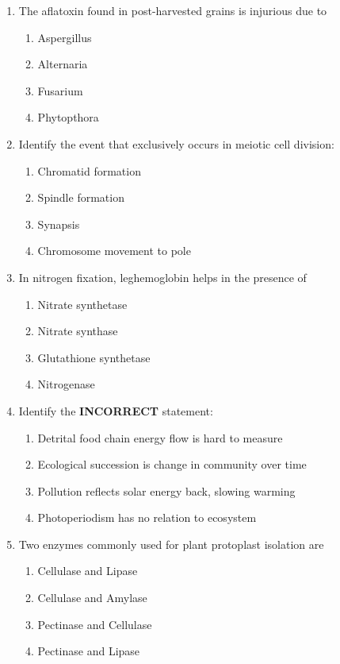 \documentclass[journal]{IEEEtran}
\begin{document}
\begin{enumerate}
\item The aflatoxin found in post-harvested grains is injurious due to\hfill  \textit{}
\begin{enumerate}
    \item Aspergillus
    \item Alternaria
    \item Fusarium
    \item Phytopthora
\end{enumerate}

\item Identify the event that exclusively occurs in meiotic cell division:\hfill  \textit{}
\begin{enumerate}
    \item Chromatid formation
    \item Spindle formation
    \item Synapsis
    \item Chromosome movement to pole
\end{enumerate}

\item In nitrogen fixation, leghemoglobin helps in the presence of\hfill  \textit{}
\begin{enumerate}
    \item Nitrate synthetase
    \item Nitrate synthase
    \item Glutathione synthetase
    \item Nitrogenase
\end{enumerate}

\item Identify the \textbf{INCORRECT} statement:\hfill  \textit{}
\begin{enumerate}
    \item Detrital food chain energy flow is hard to measure
    \item Ecological succession is change in community over time
    \item Pollution reflects solar energy back, slowing warming
    \item Photoperiodism has no relation to ecosystem
\end{enumerate}

\item Two enzymes commonly used for plant protoplast isolation are\hfill  \textit{}
\begin{enumerate}
    \item Cellulase and Lipase
    \item Cellulase and Amylase
    \item Pectinase and Cellulase
    \item Pectinase and Lipase
\end{enumerate}


\end{enumerate}
\end{document}
